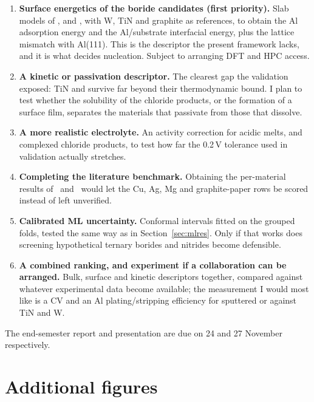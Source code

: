 \documentclass{report}
\begin{document}
\begin{enumerate}[leftmargin=*,itemsep=3pt]
\item \textbf{Surface energetics of the boride candidates (first priority).} Slab models of ,  and , with W, TiN and graphite as references, to obtain the Al adsorption energy and the Al/substrate interfacial energy, plus the lattice mismatch with Al(111). This is the descriptor the present framework lacks, and it is what decides nucleation. Subject to arranging DFT and HPC access.
\item \textbf{A kinetic or passivation descriptor.} The clearest gap the validation exposed: TiN and  survive far beyond their thermodynamic bound. I plan to test whether the solubility of the chloride products, or the formation of a surface film, separates the materials that passivate from those that dissolve.
\item \textbf{A more realistic electrolyte.} An  activity correction for acidic melts, and complexed chloride products, to test how far the 0.2\,V tolerance used in validation actually stretches.
\item \textbf{Completing the literature benchmark.} Obtaining the per-material results of~\citep{WangL2021} and~\citep{Shi2019} would let the Cu, Ag, Mg and graphite-paper rows be scored instead of left unverified.
\item \textbf{Calibrated ML uncertainty.} Conformal intervals fitted on the grouped folds, tested the same way as in Section~\ref{sec:mlres}. Only if that works does screening hypothetical ternary borides and nitrides become defensible.
\item \textbf{A combined ranking, and experiment if a collaboration can be arranged.} Bulk, surface and kinetic descriptors together, compared against whatever experimental data become available; the measurement I would most like is a CV and an Al plating/stripping efficiency for sputtered  or  against TiN and W.
\end{enumerate}

\noindent The end-semester report and presentation are due on 24 and 27 November respectively.




\appendix
\pagebreak
\section{Additional figures}
\end{document}

